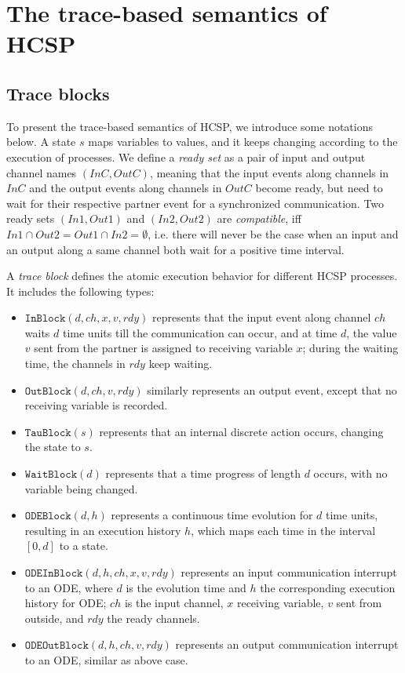 \documentclass{llncs}
\newcommand{\rdy}{\mathit{rdy}}
\begin{document}
\section{The trace-based semantics of HCSP}
 
\subsection{Trace blocks}
 
To present the trace-based semantics of HCSP, we introduce some notations below. A state $s$ maps variables to values, and it keeps changing according to the execution of processes. We define a \emph{ready set} as a pair of input and output channel names $(\mathit{InC}, \mathit{OutC})$, meaning that the input events along channels in $\mathit{InC}$ and the output events along channels in $\mathit{OutC}$ become ready, but need to wait for their respective partner event for a synchronized communication. Two ready sets $(\mathit{In}1, \mathit{Out1})$ and $(\mathit{In}2, \mathit{Out}2)$ are \emph{compatible}, iff $\mathit{In}1 \cap \mathit{Out}2 = \mathit{Out}1 \cap \mathit{In}2 = \emptyset$, i.e. there will never be the case when an input and an output along a same channel both wait for a positive time interval. 

A \emph{trace block} defines the atomic execution behavior for different HCSP processes. It includes the following types: 
\begin{itemize}
 \item $\mathtt{InBlock}(d,ch,x,v,\rdy)$ represents that the input event along channel $ch$ waits $d$ time units till the communication can occur, and at time $d$, the value $v$ sent from the partner is assigned to receiving variable $x$;  during the waiting time, the  channels in $\rdy$ keep waiting. 
 \item $\mathtt{OutBlock}(d,ch,v,\rdy)$ similarly represents an output event, except that no receiving variable is recorded.
 \item $\mathtt{TauBlock}(s)$ represents that an internal discrete action occurs, changing the state to $s$.
 \item $\mathtt{WaitBlock}(d)$ represents that a time progress of length $d$ occurs, with no variable being changed.
 \item $\mathtt{ODEBlock}(d,h)$ represents a continuous time evolution for $d$ time units, resulting in an execution history $h$, which maps each time in the interval $[0,d]$ to a state.
 \item $\mathtt{ODEInBlock}(d,h,ch,x,v,\rdy)$ represents an input communication interrupt to an ODE, where $d$ is the evolution time and $h$ the corresponding execution history for ODE; $ch$ is the input channel, $x$ receiving variable, $v$ sent from outside, and $\rdy$ the ready channels. 
 \item $\mathtt{ODEOutBlock}(d,h,ch,v,\rdy)$ represents an output communication interrupt to an ODE, similar as above case.
\end{itemize}
 
\end{document}
